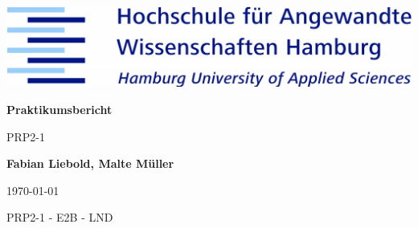 \documentclass[12pt]{scrreprt}
\begin{document}
\parindent 0pt %

\begin{titlepage}
	
	\centering
	\begin{figure}
		\vspace*{0cm}	
	\end{figure}
	
	\includegraphics[width=14cm]{img/haw_logo.jpg}\par
	\vspace{3cm}
	
	{\huge\bfseries Praktikumsbericht\par}

	\vspace{0.5cm}

	{\LARGE PRP2-1\par}
	
	\vspace{1.5cm}
	
	{\Large \bfseries Fabian Liebold, Malte Müller\par}
	
	\vspace{1.5cm}

	{\large \today\par}

	
	\vfill
	{PRP2-1 - E2B - LND} 
	

		
	
\end{titlepage}
\thispagestyle{fancy}
\thispagestyle{fancy}






\end{document}
